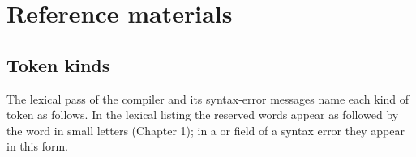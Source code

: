 \chapter{Reference materials}

\section{Token kinds}
The lexical pass of the compiler and its syntax-error messages name each
kind of token as follows.  In the lexical listing the reserved words appear
as  followed by the word in small letters (Chapter 1); in a
 or  field of a syntax error they appear in this
form.

